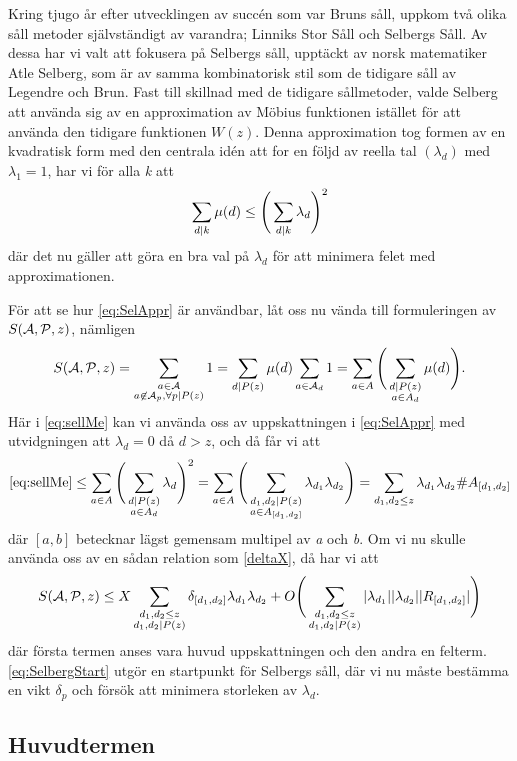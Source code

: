 Kring tjugo år efter utvecklingen av succén som var Bruns såll, uppkom två olika såll metoder självständigt av varandra; Linniks Stor Såll och Selbergs Såll. Av dessa har vi valt att fokusera på Selbergs såll, upptäckt av norsk matematiker Atle Selberg, som är av samma kombinatorisk stil som de tidigare såll av Legendre och Brun. Fast till skillnad med de tidigare sållmetoder, valde Selberg att använda sig av en approximation av Möbius funktionen istället för att använda den tidigare funktionen \(W(z)\). Denna approximation tog formen av en kvadratisk form med den centrala idén att for en följd av reella tal \((\lambda_d)\) med \(\lambda_1 = 1\), har vi för alla \textit{k} att 
\begin{equation}
    \sum_{d\divides k} \mu(d) \leq \Bigg(\sum_{d\divides k}\lambda_d\Bigg)^2\label{eq:SelAppr}
\end{equation}
där det nu gäller att göra en bra val på \(\lambda_d\) för att minimera felet med approximationen. 

För att se hur \eqref{eq:SelAppr} är användbar, låt oss nu vända till formuleringen av \(\S{A}{P}{z}\), nämligen
\begin{align}
    \S{A}{P}{z} = \sum_{\substack{a\in \mathcal{A}\\a\not\in\mathcal{A}_p,\forall p\divides P(z)}} 1 = \sum_{d\divides P(z)} \mu(d) \sum_{a\in\mathcal{A}_d}1 = \sum_{a\in A} \Bigg(\sum_{\substack{d\divides P(z)\\a\in A_d}}\mu(d)\Bigg).\label{eq:sellMe}
\end{align}
Här i \eqref{eq:sellMe} kan vi använda oss av uppskattningen i \eqref{eq:SelAppr} med utvidgningen att \(\lambda_d=0\) då \(d>z\), och då får vi att
\begin{equation}
    \eqref{eq:sellMe} \leq \sum_{a\in A}\Bigg(\sum_{\substack{d\divides P(z)\\a\in A_d}}\lambda_d\Bigg)^2 = \sum_{a\in A}\Bigg(\sum_{\substack{d_1,d_2\divides P(z)\\a\in A_{[d_1, d_2]}}}\lambda_{d_1}\lambda_{d_2}\Bigg) =  \sum_{d_1,d_2\leq z}\lambda_{d_1}\lambda_{d_2}\#A_{[d_1, d_2]}\label{eq:2FatLs}
\end{equation}
där \([a, b]\) betecknar lägst gemensam multipel av \textit{a} och \textit{b}. Om vi nu skulle använda oss av en sådan relation som \eqref{deltaX}, då har vi att 
\begin{equation}
    \S{A}{P}{z} \leq X\sum_{\substack{d_1,d_2\leq z\\d_1,d_2\divides P(z)}}\delta_{[d_1, d_2]}\lambda_{d_1}\lambda_{d_2} + O\Bigg(\sum_{\substack{d_1,d_2\leq z\\d_1,d_2\divides P(z)}}|\lambda_{d_1}||\lambda_{d_2}||R_{[d_1, d_2]}|\Bigg)\label{eq:SelbergStart}
\end{equation}
där första termen anses vara huvud uppskattningen och den andra en felterm. \eqref{eq:SelbergStart} utgör en startpunkt för Selbergs såll, där vi nu måste bestämma en vikt \(\delta_p\) och försök att minimera storleken av \(\lambda_d\).
\subsection{Huvudtermen}

